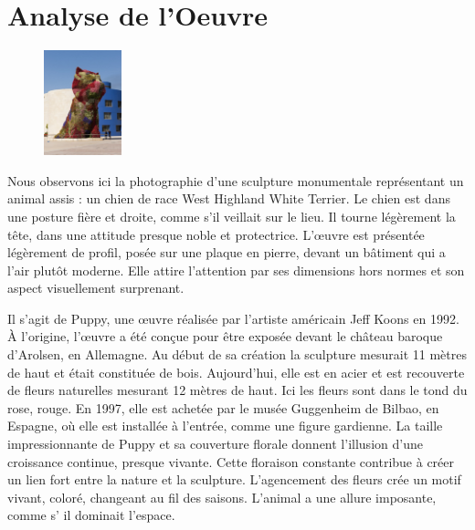 \documentclass[12pt]{article}
\begin{document}




\section{Analyse de l'Oeuvre}

\begin{figure}
    \centering
    \includegraphics[width=0.2\textwidth]{./images/photo-chien.jpg}
\end{figure}

Nous observons ici la photographie d’une sculpture monumentale représentant un animal assis : un chien de race West Highland White Terrier. 
Le chien est dans une posture fière et droite, comme s’il veillait sur le lieu. 
Il tourne légèrement la tête, dans une attitude presque noble et protectrice. 
L’œuvre est présentée légèrement de profil, posée sur une plaque en pierre, devant un bâtiment qui a l’air plutôt moderne. 
Elle attire l’attention par ses dimensions hors normes et son aspect visuellement surprenant. 

Il s'agit de Puppy, une œuvre réalisée par l’artiste américain Jeff Koons en 1992. 
À l’origine, l’œuvre a été conçue pour être exposée devant le château baroque d’Arolsen, en Allemagne. 
Au début de sa création la sculpture mesurait 11 mètres de haut et était constituée de bois. Aujourd’hui, elle est en acier et est recouverte de fleurs naturelles mesurant 12 mètres de haut. Ici les fleurs sont dans le tond du rose, rouge. En 1997, elle est achetée par le musée Guggenheim de Bilbao, en Espagne, où elle est installée à l’entrée, comme une figure gardienne.
La taille impressionnante de Puppy et sa couverture florale donnent l’illusion d’une croissance continue, presque vivante. Cette floraison constante contribue à créer un lien fort entre la nature et la sculpture. L’agencement des fleurs crée un motif vivant, coloré, changeant au fil des saisons. L’animal a une allure imposante, comme s' il dominait l’espace.
\end{document}
